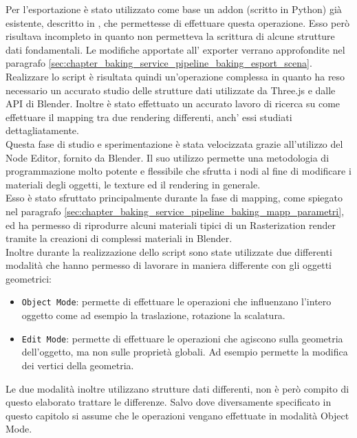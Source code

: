 Per l’esportazione è stato utilizzato come base un addon (scritto in Python) già esistente, descritto in \cite{io_three} , che permettesse di effettuare questa operazione. Esso però risultava incompleto in quanto non permetteva la scrittura di alcune strutture dati fondamentali. Le modifiche apportate all’ exporter verrano approfondite nel paragrafo \ref{sec:chapter_baking_service_pipeline_baking_esport_scena}.
\\
Realizzare lo script è risultata quindi un’operazione complessa in quanto ha reso necessario un accurato studio delle strutture dati utilizzate da Three.js e dalle API di Blender.
Inoltre è stato effettuato un accurato lavoro di ricerca su come effettuare il mapping tra due rendering differenti, anch’ essi studiati dettagliatamente.
\\
Questa fase di studio e sperimentazione è stata velocizzata grazie all’utilizzo del Node Editor, fornito da Blender.
Il suo utilizzo permette una metodologia di programmazione molto potente e flessibile che sfrutta i nodi al fine di modificare i materiali degli oggetti, le texture ed il rendering in generale.
\\
Esso è stato sfruttato principalmente durante la fase di mapping, come spiegato nel paragrafo \ref{sec:chapter_baking_service_pipeline_baking_mapp_parametri}, ed ha permesso di riprodurre alcuni materiali tipici di un Rasterization render tramite la creazioni di complessi materiali in Blender.
\\
Inoltre durante la realizzazione dello script sono state utilizzate due differenti modalità che hanno permesso di lavorare in maniera differente con gli oggetti geometrici:
\begin{itemize}
\item \texttt{Object Mode}: permette di effettuare le operazioni che influenzano l’intero oggetto come ad esempio la traslazione, rotazione la scalatura.
\item \texttt{Edit Mode}: permette di effettuare le operazioni che agiscono sulla geometria dell’oggetto, ma non sulle proprietà globali. Ad esempio permette la modifica dei vertici della geometria.
\end{itemize}
Le due modalità inoltre utilizzano strutture dati differenti, non è però compito di questo elaborato trattare le differenze.
Salvo dove diversamente specificato in questo capitolo si assume che le operazioni vengano effettuate in modalità Object Mode. 


